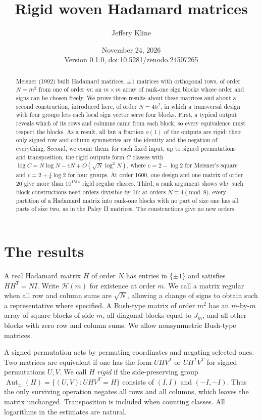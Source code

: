 \documentclass[11pt,reqno]{amsart}
\title[Rigid woven Hadamard matrices]{Rigid woven Hadamard matrices}
\author{Jeffery Kline}
\date{November 24, 2026\\[3pt]\small Version 0.1.0, \href{https://doi.org/10.5281/zenodo.24507265}{doi:10.5281/zenodo.24507265}}
\theoremstyle{remark}\newtheorem{remark}[theorem]{Remark}
\newcommand{\Aut}{\operatorname{Aut}_{\pm}}
\newcommand{\HH}{\mathcal H}
\begin{document}
\begin{abstract}
Meisner (1992) built Hadamard matrices, \(\pm1\) matrices with orthogonal rows, of order \(N=m^2\) from one of order \(m\): an \(m\times m\) array of rank-one sign blocks whose order and signs can be chosen freely. We prove three results about these matrices and about a second construction, introduced here, of order \(N=4h^2\), in which a transversal design with four groups lets each local sign vector serve four blocks. First, a typical output reveals which of its rows and columns came from each block, so every equivalence must respect the blocks. As a result, all but a fraction \(o(1)\) of the outputs are rigid: their only signed row and column symmetries are the identity and the negation of everything. Second, we count them: for each fixed input, up to signed permutations and transposition, the rigid outputs form \(C\) classes with \(\log C=N\log N-cN+O(\sqrt N\log^2N)\), where \(c=2-\log2\) for Meisner's square and \(c=2+\tfrac18\log2\) for four groups. At order 1600, one design and one matrix of order 20 give more than \(10^{1514}\) rigid regular classes. Third, a rank argument shows why such block constructions need orders divisible by 16: at orders \(N\equiv4\pmod 8\), every partition of a Hadamard matrix into rank-one blocks with no part of size one has all parts of size two, as in the Paley II matrices. The constructions give no new orders.
\end{abstract}
\maketitle

\section{The results}
A real Hadamard matrix \(H\) of order \(N\) has entries in \(\{\pm1\}\) and satisfies \(HH^T=NI\). Write \(\HH(m)\) for existence at order \(m\). We call a matrix regular when all row and column sums are \(\sqrt N\), allowing a change of signs to obtain such a representative where specified. A Bush-type matrix of order \(m^2\) has an \(m\)-by-\(m\) array of square blocks of side \(m\), all diagonal blocks equal to \(J_m\), and all other blocks with zero row and column sums. We allow nonsymmetric Bush-type matrices.

A signed permutation acts by permuting coordinates and negating selected ones. Two matrices are equivalent if one has the form \(UHV^T\) or \(UH^TV^T\) for signed permutations \(U,V\). We call \(H\) \emph{rigid} if the side-preserving group \(\Aut(H)=\{(U,V):UHV^T=H\}\) consists of \((I,I)\) and \((-I,-I)\). Thus the only surviving operation negates all rows and all columns, which leaves the matrix unchanged. Transposition is included when counting classes. All logarithms in the estimates are natural.
\end{document}
